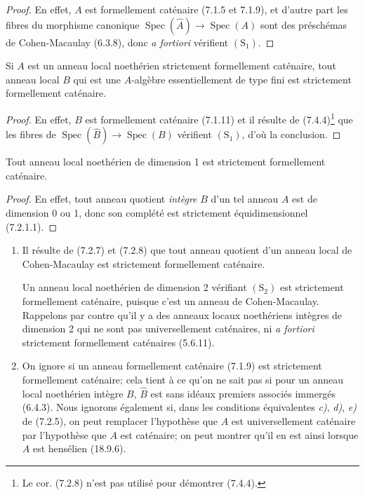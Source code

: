 \begin{proof}
En effet, $A$ est formellement caténaire (7.1.5 et 7.1.9), et d'autre part
les fibres du morphisme canonique
$\operatorname{Spec}(\widehat A)\to\operatorname{Spec}(A)$ sont des
préschémas de Cohen-Macaulay (6.3.8), donc \emph{a fortiori} vérifient
$(\mathrm S_1)$.
\end{proof}

\begin{corollary}[7.2.8]
\label{IV.2.s7.2.8-fr}
Si $A$ est un anneau local noethérien strictement formellement caténaire,
tout anneau local $B$ qui est une $A$-algèbre essentiellement de type fini
est strictement formellement caténaire.
\end{corollary}

\begin{proof}
En effet, $B$ est formellement caténaire (7.1.11) et il résulte de
(7.4.4)\footnote{Le cor. (7.2.8) n'est pas utilisé pour démontrer (7.4.4).}
que les fibres de
$\operatorname{Spec}(\widehat B)\to\operatorname{Spec}(B)$ vérifient
$(\mathrm S_1)$, d'où la conclusion.
\end{proof}

\begin{corollary}[7.2.9]
Tout anneau local noethérien de dimension 1 est strictement formellement
caténaire.
\end{corollary}

\begin{proof}
En effet, tout anneau quotient \emph{intègre} $B$ d'un tel anneau $A$ est de
dimension 0 ou 1, donc son complété est strictement équidimensionnel
(7.2.1.1).
\end{proof}

\begin{remarks}[7.2.10]
\label{IV.2.s7.2.10-fr}
\begin{enumerate}
\item[(i)] Il résulte de (7.2.7) et (7.2.8) que tout anneau quotient d'un
anneau local de Cohen-Macaulay est strictement formellement caténaire.

Un anneau local noethérien de dimension 2 vérifiant $(\mathrm S_2)$ est
strictement formellement caténaire, puisque c'est un anneau de
Cohen-Macaulay. Rappelons par contre qu'il y a des anneaux locaux
noethériens intègres de dimension 2 qui ne sont pas universellement
caténaires, ni \emph{a fortiori} strictement formellement caténaires
(5.6.11).
\item[(ii)] On ignore si un anneau formellement caténaire (7.1.9) est
strictement formellement caténaire; cela tient à ce qu'on ne sait pas si
pour un anneau local noethérien intègre $B$, $\widehat B$ est sans idéaux
premiers associés immergés (6.4.3). Nous ignorons également si, dans les
conditions équivalentes \emph{c)}, \emph{d)}, \emph{e)} de (7.2.5), on peut remplacer
l'hypothèse que $A$ est universellement caténaire par l'hypothèse que $A$
est caténaire; on peut montrer qu'il en est ainsi lorsque $A$ est hensélien
(18.9.6).
\end{enumerate}
\end{remarks}

